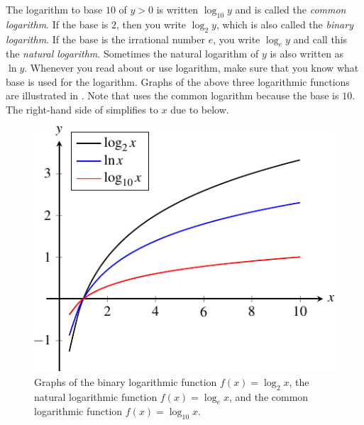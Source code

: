 \documentclass[a4paper,oneside,12pt]{article}
\begin{document}
The logarithm to base $10$ of $y > 0$ is written $\log_{10} y$ and is
called the \emph{common logarithm}.  If the base is $2$, then you
write $\log_2 y$, which is also called the \emph{binary logarithm}.
If the base is the irrational number $e$, you write $\log_e y$ and
call this the \emph{natural logarithm}.  Sometimes the natural
logarithm of $y$ is also written as $\ln y$.  Whenever you read about
or use logarithm, make sure that you know what base is used for the
logarithm.  Graphs of the above three logarithmic functions are
illustrated in .  Note that
 uses the common logarithm because the base is
$10$.  The right-hand side of  simplifies to
$x$ due to  below.

\begin{figure}[!htbp]
\centering
\includegraphics[scale=1.1]{image/12/logarithm.pdf}
\caption{%
  Graphs of the binary logarithmic function $f(x) = \log_2 x$, the
  natural logarithmic function $f(x) = \log_e x$, and the common
  logarithmic function $f(x) = \log_{10} x$.
}
\label{fig:logarithm:graphs}
\end{figure}
\end{document}
